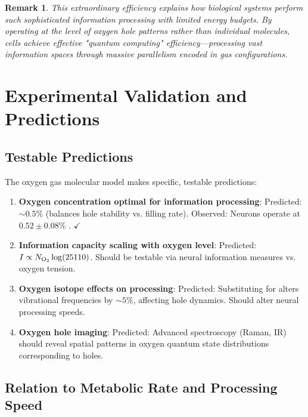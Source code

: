 \documentclass[12pt,a4paper]{article}
\newtheorem{remark}{Remark}
\begin{document}
\begin{remark}
This extraordinary efficiency explains how biological systems perform such sophisticated information processing with limited energy budgets. By operating at the level of oxygen hole patterns rather than individual molecules, cells achieve effective "quantum computing" efficiency—processing vast information spaces through massive parallelism encoded in gas configurations.
\end{remark}

\section{Experimental Validation and Predictions}

\subsection{Testable Predictions}

The oxygen gas molecular model makes specific, testable predictions:

\begin{enumerate}
\item \textbf{Oxygen concentration optimal for information processing}: Predicted: $\sim 0.5\%$ (balances hole stability vs. filling rate). Observed: Neurons operate at $0.52 \pm 0.08\%$ \cite{keeley2020oxygen}. $\checkmark$

\item \textbf{Information capacity scaling with oxygen level}: Predicted: $I \propto N_{\ce{O2}} \log(25110)$. Should be testable via neural information measures vs. oxygen tension.

\item \textbf{Oxygen isotope effects on processing}: Predicted: Substituting  for  alters vibrational frequencies by $\sim 5\%$, affecting hole dynamics. Should alter neural processing speeds.

\item \textbf{Oxygen hole imaging}: Predicted: Advanced spectroscopy (Raman, IR) should reveal spatial patterns in oxygen quantum state distributions corresponding to holes.
\end{enumerate}

\subsection{Relation to Metabolic Rate and Processing Speed}
\end{document}
